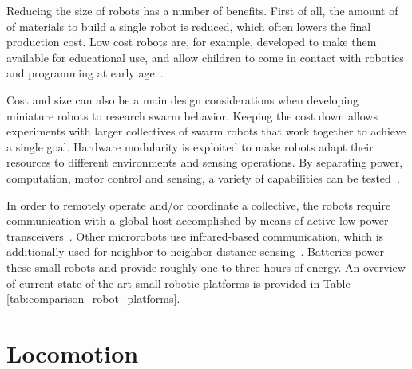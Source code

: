 




Reducing the size of robots has a number of benefits.
First of all, the amount of of materials to build a single robot is reduced, which often lowers the final production cost.
Low cost robots are, for example, developed to make them available for educational use, and allow children to come in contact with robotics and programming at early age~\cite{rubenstein_icra_2015}.

Cost and size can also be a main design considerations when developing miniature robots to research swarm behavior.
Keeping the cost down allows experiments with larger collectives of swarm robots that work together to achieve a single goal.
Hardware modularity is exploited to make robots adapt their resources to different environments and sensing operations.
By separating power, computation, motor control and sensing, a variety of capabilities can be tested~\cite{sabelhaus_icra_2013, pickem_icra_2015, kim_iros_2016}.

In order to remotely operate and/or coordinate a collective, the robots require communication with a global host accomplished by means of active low power transceivers~\cite{sabelhaus_icra_2013, pickem_icra_2015, kim_iros_2016}. 
Other microrobots use infrared-based communication, which is additionally used for neighbor to neighbor distance sensing~\cite{rubenstein_icra_2012}.
Batteries power these small robots and provide roughly one to three hours of energy.
An overview of current state of the art small robotic platforms is provided in Table \ref{tab:comparison_robot_platforms}.


\section{Locomotion}
\label{sec:rw_locomotion}


